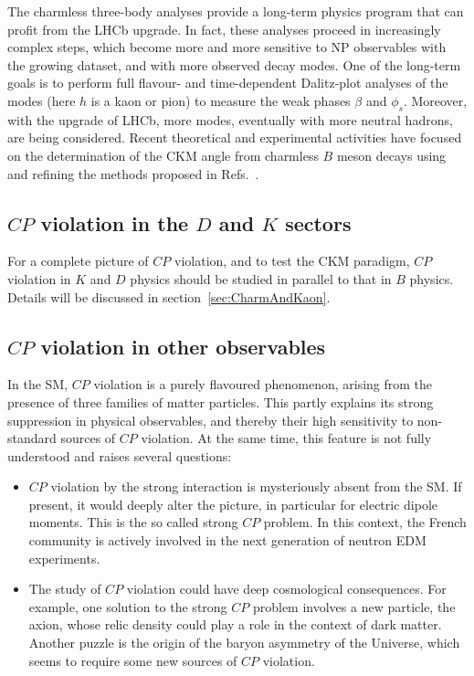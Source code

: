 The charmless three-body analyses provide a long-term physics program that can profit from the LHCb upgrade. In fact, these analyses proceed in increasingly complex steps, which become more and more sensitive to NP observables with the growing dataset, and with more observed decay modes. One of the long-term goals is to perform full flavour- and time-dependent Dalitz-plot analyses of the \BstoKshhp modes (here $h$ is a kaon or pion) to measure the weak phases $\beta$ and $\phi_s$. Moreover, with the upgrade of LHCb, more modes, eventually with more neutral hadrons, are being considered. Recent theoretical and experimental activities have focused on the determination of the CKM angle \Pgamma from charmless $B$ meson decays using and refining the methods proposed in Refs.~\cite{Ciuchini:2006kv,Gronau:2006qn,Bhattacharya:2013cla}.  






\subsection*{$CP$ violation in the $D$ and $K$ sectors}

For a complete picture of $CP$ violation, and to test the CKM paradigm, $CP$
violation in $K$ and $D$ physics should be studied in parallel to that in $B$
physics. Details will be discussed in section~\ref{sec:CharmAndKaon}. 


\subsection*{$CP$ violation in other observables}

In the SM, $CP$ violation is a purely flavoured phenomenon, arising from the
presence of three families of matter particles. This partly explains its
strong suppression in physical observables, and thereby their high sensitivity
to non-standard sources of $CP$ violation. At the same time, this feature is not
fully understood and raises several questions:

\begin{itemize}
\item $CP$ violation by the strong interaction is mysteriously absent from the
SM. If present, it would deeply alter the picture, in particular for electric
dipole moments. This is the so called strong $CP$ problem. In this context, the
French community is actively involved in the next generation of neutron EDM experiments.

\item The study of $CP$ violation could have deep cosmological consequences. For
example, one solution to the strong $CP$ problem involves a new particle, the
axion, whose relic density could play a role in the context of dark matter.
Another puzzle is the origin of the baryon asymmetry of the Universe, which
seems to require some new sources of $CP$ violation.
\end{itemize}

